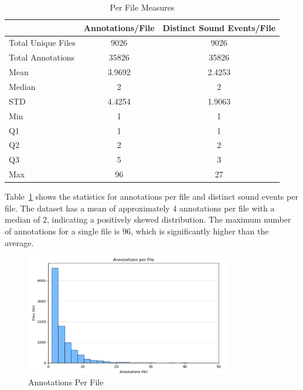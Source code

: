 \documentclass{article}
\begin{document}
\begin{table}[ht]
  \caption{Per File Measures}
  \label{tab:per_file}
  \centering
  \begin{tabular}{lcc}
    \toprule
    & Annotations/File & Distinct Sound Events/File \\
    \midrule
    Total Unique Files & 9026 & 9026 \\
    Total Annotations & 35826 & 35826 \\
    Mean & 3.9692 & 2.4253 \\
    Median & 2 & 2 \\
    STD & 4.4254 & 1.9063 \\
    Min & 1 & 1 \\
    Q1 & 1 & 1 \\
    Q2 & 2 & 2 \\
    Q3 & 5 & 3 \\
    Max & 96 & 27 \\
    \bottomrule
  \end{tabular}
\end{table}

Table~\ref{tab:per_file} shows the statistics for annotations per file and distinct sound events per file. The dataset has a mean of approximately 4 annotations per file with a median of 2, indicating a positively skewed distribution. The maximum number of annotations for a single file is 96, which is significantly higher than the average.

\begin{figure}[ht]
  \centering
  \includegraphics[width=0.8\textwidth]{figures/annotation_quality/annotations_per_file.png}
  \caption{Annotations Per File}
  \label{fig:annotations_per_file}
\end{figure}
\end{document}
